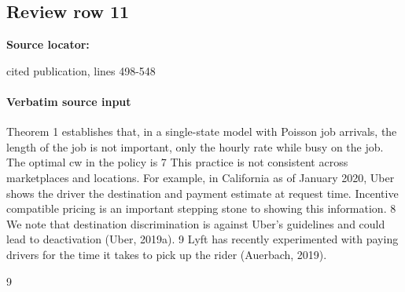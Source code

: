 \documentclass[10pt]{article}
\begin{document}
\subsection*{Review row 11}
\textbf{Source locator:} {\footnotesize\raggedright cited publication, lines 498-\allowbreak{}548\par}
\paragraph{Verbatim source input}
\begin{ReviewVerbatim}
Theorem 1 establishes that, in a single-state model with Poisson job arrivals, the length of the
job is not important, only the hourly rate while busy on the job. The optimal cw in the policy is
7
This practice is not consistent across marketplaces and locations. For example, in California as of January 2020,
Uber shows the driver the destination and payment estimate at request time. Incentive compatible pricing is an
important stepping stone to showing this information.
8
We note that destination discrimination is against Uber’s guidelines and could lead to deactivation (Uber, 2019a).
9
Lyft has recently experimented with paying drivers for the time it takes to pick up the rider (Auerbach, 2019).

9



\end{ReviewVerbatim}
\end{document}
